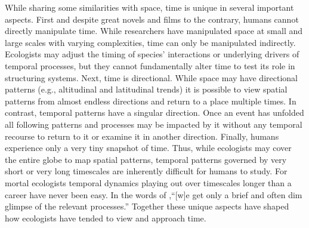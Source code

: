 \documentclass[11pt,a4paper,oneside]{article}
\begin{document}
While sharing some similarities with space, time is unique in several important aspects. First and despite great novels and films to the contrary, humans cannot directly manipulate time. While researchers have manipulated space at small \citep[e.g.,][]{huffaker} and large \citep[e.g.,][]{Terborgh:2001bw} scales with varying complexities, time can only be manipulated indirectly. Ecologists may adjust the timing of species' interactions \citep{Yang:2010cq} or underlying drivers of temporal processes, but they cannot fundamentally alter time to test its role in structuring systems. Next, time is directional. While space may have directional patterns (e.g., altitudinal and latitudinal trends) it is possible to view spatial patterns from almost endless directions and return to a place multiple times. In contrast, temporal patterns have a singular direction. Once an event has unfolded all following patterns and processes may be impacted by it without any temporal recourse to return to it or examine it in another direction. Finally, humans experience only a very tiny snapshot of time. Thus, while ecologists may cover the entire globe to map spatial patterns, temporal patterns governed by very short or very long timescales are inherently difficult for humans to study. For mortal ecologists temporal dynamics playing out over timescales longer than a career have never been easy. In the words of \citet{wiens1986},``[w]e get only a brief and often dim glimpse of the relevant processes.'' Together these unique aspects have shaped how ecologists have tended to view and approach time. \\

\\
\end{document}
